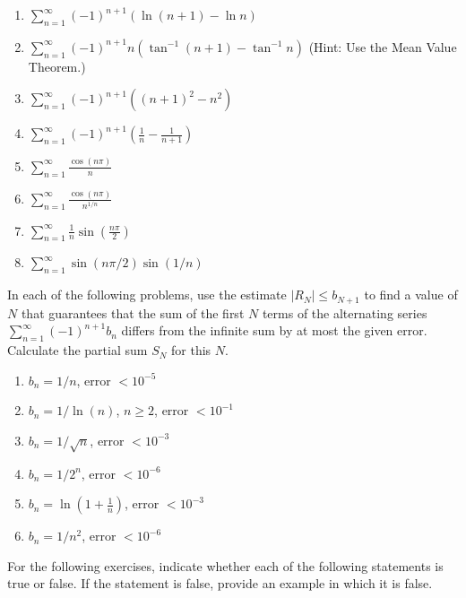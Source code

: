 \documentclass{exercises}
\begin{document}
\begin{enumerate}[start=1]
\item $\sum_{n=1}^{\infty}{(-1)}^{n+1}(\ln(n+1)-\ln n)$
\item $\sum_{n=1}^{\infty}{(-1)}^{n+1}n(\tan^{-1}(n+1)-\tan^{-1}n)$ (Hint: Use the Mean Value Theorem.)
\item $\sum_{n=1}^{\infty}{(-1)}^{n+1}({(n+1)}^{2}-n^{2})$
\item $\sum_{n=1}^{\infty}{(-1)}^{n+1}(\frac{1}{n}-\frac{1}{n+1})$
\item $\sum_{n=1}^{\infty}\frac{\cos(n\pi)}{n}$
\item $\sum_{n=1}^{\infty}\frac{\cos(n\pi)}{n^{1/n}}$
\item $\sum_{n=1}^{\infty}\frac{1}{n}\sin(\frac{n\pi}{2})$
\item $\sum_{n=1}^{\infty}\sin(n\pi/2)\sin(1/n)$
\end{enumerate}

In each of the following problems, use the estimate $|R_{N}|\le b_{N+1}$ to find a value of $N$ that guarantees that the sum of the first $N$ terms of the alternating series $\sum_{n=1}^{\infty}{(-1)}^{n+1}b_{n}$ differs from the infinite sum by at most the given error. Calculate the partial sum $S_{N}$ for this $N$.

\begin{enumerate}[resume]
\item \techrequired $b_{n}=1/n$, error $<10^{-5}$
\item \techrequired $b_{n}=1/\ln(n)$, $n\ge2$, error $<10^{-1}$
\item \techrequired $b_{n}=1/\sqrt{n}$, error $<10^{-3}$
\item \techrequired $b_{n}=1/2^{n}$, error $<10^{-6}$
\item \techrequired $b_{n}=\ln(1+\frac{1}{n})$, error $<10^{-3}$
\item \techrequired $b_{n}=1/n^{2}$, error $<10^{-6}$
\end{enumerate}

For the following exercises, indicate whether each of the following statements is true or false. If the statement is false, provide an example in which it is false.
\end{document}

